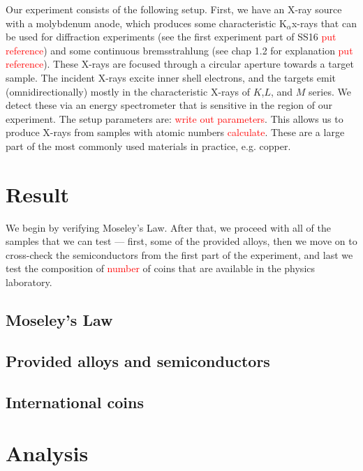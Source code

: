 \documentclass[11pt,a4paper,twoside,onecolumn]{article}
\newcommand{\reminder}[1]{\textcolor{red}{#1}}
\newcommand{\Kalpha}{$\mathrm{K}_\alpha$}
\begin{document}
Our experiment consists of the following setup. First, we have an X-ray source with a molybdenum anode, which produces some characteristic \Kalpha x-rays that can be used for diffraction experiments (see the first experiment part of SS16 \reminder{put reference}) and some continuous bremsstrahlung (see chap 1.2 for explanation \reminder{put reference}). These X-rays are focused through a circular aperture towards a target sample. The incident X-rays excite inner shell electrons, and the targets emit (omnidirectionally) mostly in the characteristic X-rays of $K$,$L$, and $M$ series. We detect these via an energy spectrometer that is sensitive in the region of our experiment. The setup parameters are:  \reminder{write out parameters}. This allows us to produce X-rays from samples with atomic numbers \reminder{calculate}. These are a large part of the most commonly used materials in practice, e.g. copper.


\section{Result}
We begin by verifying Moseley's Law. After that, we proceed with all of the samples that we can test --- first, some of the provided alloys, then we move on to cross-check the semiconductors from the first part of the experiment, and last we test the composition of \reminder{number} of coins that are available in the physics laboratory.

\subsection{Moseley's Law}

\subsection{Provided alloys and semiconductors}

\subsection{International coins}

\section{Analysis}
\lipsum
\end{document}

